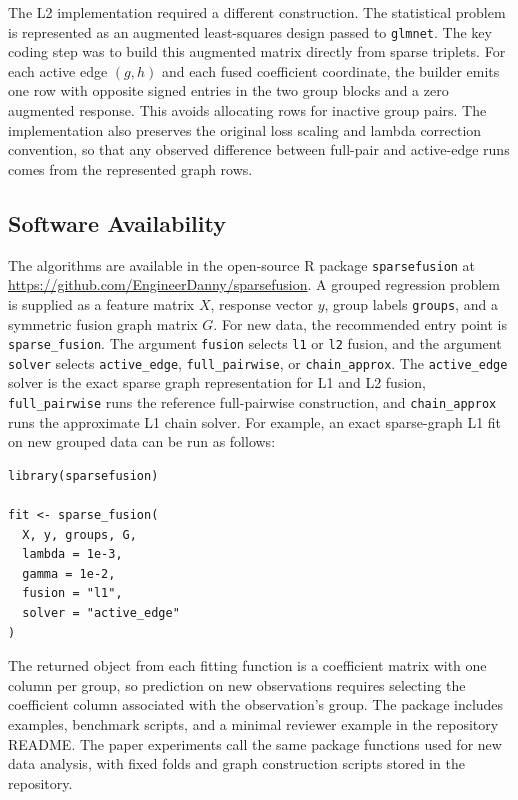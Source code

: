 \documentclass[twoside,11pt]{article}
\begin{document}
The L2 implementation required a different construction. 
The statistical problem is represented as an augmented least-squares design passed to \texttt{glmnet}. 
The key coding step was to build this augmented matrix directly from sparse triplets. 
For each active edge $(g,h)$ and each fused coefficient coordinate, the builder emits one row with opposite signed entries in the two group blocks and a zero augmented response. 
This avoids allocating rows for inactive group pairs. 
The implementation also preserves the original loss scaling and lambda correction convention, so that any observed difference between full-pair and active-edge runs comes from the represented graph rows.

\subsection{Software Availability}

The algorithms are available in the open-source R package \texttt{sparsefusion} at \url{https://github.com/EngineerDanny/sparsefusion}. 
A grouped regression problem is supplied as a feature matrix $X$, response vector $y$, group labels \texttt{groups}, and a symmetric fusion graph matrix $G$.
For new data, the recommended entry point is \texttt{sparse\_fusion}. 
The argument \texttt{fusion} selects \texttt{l1} or \texttt{l2} fusion, and the argument \texttt{solver} selects \texttt{active\_edge}, \texttt{full\_pairwise}, or \texttt{chain\_approx}. 
The \texttt{active\_edge} solver is the exact sparse graph representation for L1 and L2 fusion, \texttt{full\_pairwise} runs the reference full-pairwise construction, and \texttt{chain\_approx} runs the approximate L1 chain solver.
For example, an exact sparse-graph L1 fit on new grouped data can be run as
follows:
\begin{verbatim}
library(sparsefusion)

fit <- sparse_fusion(
  X, y, groups, G,
  lambda = 1e-3,
  gamma = 1e-2,
  fusion = "l1",
  solver = "active_edge"
)
\end{verbatim}

The returned object from each fitting function is a coefficient matrix with one column per group, so prediction on new observations requires selecting the coefficient column associated with the observation's group. 
The package includes examples, benchmark scripts, and a minimal reviewer example in the
repository README. 
The paper experiments call the same package functions used for new data analysis, with fixed folds and graph construction scripts stored
in the repository.
\end{document}
